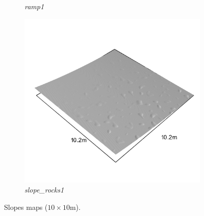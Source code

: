 \documentclass[../document.tex]{subfiles}
\begin{document}
\begin{figure}[htbp]
\begin{subfigure}[b]{0.32\linewidth}
            \caption{\emph{ramp1}}
            \end{subfigure}    
          \begin{subfigure}[b]{0.32\textwidth}
            \includegraphics[width=\textwidth]{../img/hm3d_borders/slope_rocks1.png}
            \caption{\emph{slope\_rocks1}}
        \end{subfigure}    
    \caption{Slopes maps ($10\times10$m).}
\end{figure}
\end{document}
